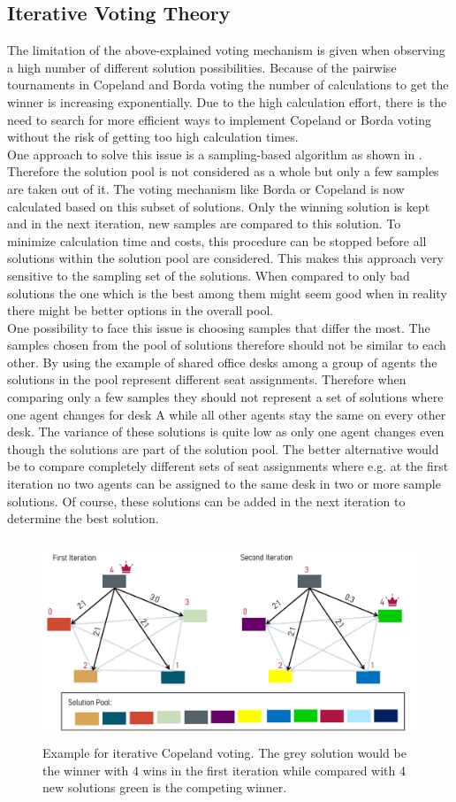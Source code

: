 \documentclass[german, a4paper, 11pt, oneside]{scrbook}
\begin{document}
\subsection{Iterative Voting Theory}
The limitation of the above-explained voting mechanism is given when observing a high number of different solution possibilities. Because of the pairwise tournaments in Copeland and Borda voting the number of calculations to get the winner is increasing exponentially. Due to the high calculation effort, there is the need to search for more efficient ways to implement Copeland or Borda voting without the risk of getting too high calculation times. \cite{Bhavnani.2022b}
\\One approach to solve this issue is a sampling-based algorithm as shown in \cite{Bhavnani.2022b}. Therefore the solution pool is not considered as a whole but only a few samples are taken out of it. The voting mechanism like Borda or Copeland is now calculated based on this subset of solutions. Only the winning solution is kept and in the next iteration, new samples are compared to this solution. To minimize calculation time and costs, this procedure can be stopped before all solutions within the solution pool are considered. This makes this approach very sensitive to the sampling set of the solutions. When compared to only bad solutions the one which is the best among them might seem good when in reality there might be better options in the overall pool. \cite{Bhavnani.2022b} \\One possibility to face this issue is choosing samples that differ the most. The samples chosen from the pool of solutions therefore should not be similar to each other. By using the example of shared office desks among a group of agents the solutions in the pool represent different seat assignments. Therefore when comparing only a few samples they should not represent a set of solutions where one agent changes for desk A while all other agents stay the same on every other desk. The variance of these solutions is quite low as only one agent changes even though the solutions are part of the solution pool. The better alternative would be to compare completely different sets of seat assignments where e.g. at the first iteration no two agents can be assigned to the same desk in two or more sample solutions. Of course, these solutions can be added in the next iteration to determine the best solution.
\begin{figure}[h]
\centering
\includegraphics[height=6cm]{Iterative_voting}
\caption{Example for iterative Copeland voting. The grey solution would be the winner with 4 wins in the first iteration while compared with 4 new solutions green is the competing winner.}
\end{figure}
\end{document}
